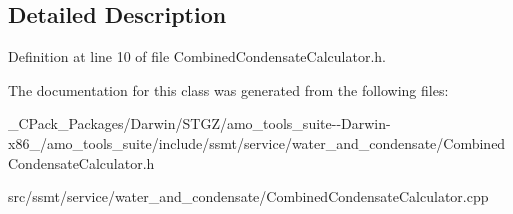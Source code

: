 \subsection{Detailed Description}


Definition at line 10 of file Combined\+Condensate\+Calculator.\+h.



The documentation for this class was generated from the following files\+:\begin{DoxyCompactItemize}
\item 
\+\_\+\+C\+Pack\+\_\+\+Packages/\+Darwin/\+S\+T\+G\+Z/amo\+\_\+tools\+\_\+suite-\/-\/\+Darwin-\/x86\+\_/amo\+\_\+tools\+\_\+suite/include/ssmt/service/water\+\_\+and\+\_\+condensate/Combined\+Condensate\+Calculator.\+h\item 
src/ssmt/service/water\+\_\+and\+\_\+condensate/Combined\+Condensate\+Calculator.\+cpp\end{DoxyCompactItemize}
